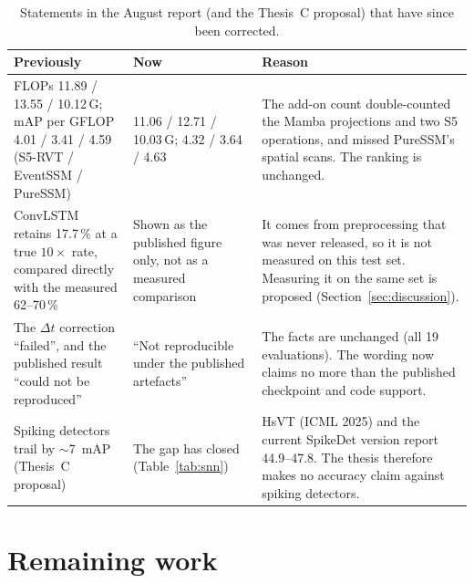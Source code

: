 \documentclass[10pt,a4paper]{article}
\begin{document}
\begin{table}[htbp]
\centering\small
\caption{Statements in the August report (and the Thesis~C proposal) that have since been corrected.}
\label{tab:corrections}
\begin{tabularx}{\textwidth}{@{}p{} p{} Y@{}}
\toprule
\textbf{Previously} & \textbf{Now} & \textbf{Reason} \\
\midrule
FLOPs 11.89 / 13.55 / 10.12\,G; mAP per GFLOP 4.01 / 3.41 / 4.59 (S5-RVT / EventSSM / PureSSM) &
  11.06 / 12.71 / 10.03\,G; 4.32 / 3.64 / 4.63 &
  The add-on count double-counted the Mamba projections and two S5 operations, and missed PureSSM's spatial
  scans. The ranking is unchanged. \\
ConvLSTM retains 17.7\,\% at a true $10\times$ rate, compared directly with the measured 62--70\,\% &
  Shown as the published figure only, not as a measured comparison &
  It comes from preprocessing that was never released, so it is not measured on this test set. Measuring
  it on the same set is proposed (Section~\ref{sec:discussion}). \\
The $\Delta t$ correction ``failed'', and the published result ``could not be reproduced'' &
  ``Not reproducible under the published artefacts'' &
  The facts are unchanged (all 19 evaluations). The wording now claims no more than the published checkpoint
  and code support. \\
Spiking detectors trail by $\sim$7~mAP (Thesis~C proposal) &
  The gap has closed (Table~\ref{tab:snn}) &
  HsVT (ICML 2025) and the current SpikeDet version report 44.9--47.8. The thesis therefore makes no
  accuracy claim against spiking detectors. \\
\bottomrule
\end{tabularx}
\end{table}

\section{Remaining work}
\end{document}
